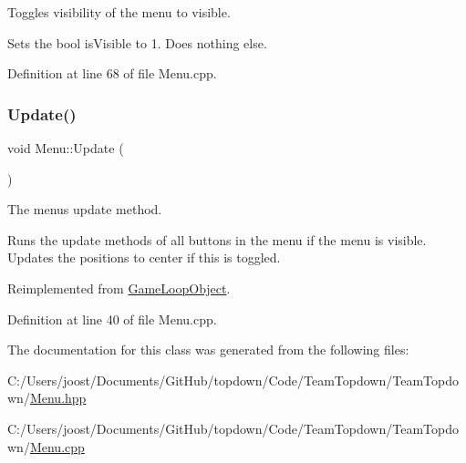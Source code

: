 Toggles visibility of the menu to visible. 

Sets the bool is\+Visible to 1. Does nothing else. 

Definition at line 68 of file Menu.\+cpp.

\mbox{\label{class_menu_af29d71473a414e31e914bc637840cb3e}} 
\subsubsection{\texorpdfstring{Update()}{Update()}}
{\footnotesize\ttfamily void Menu\+::\+Update (\begin{DoxyParamCaption}{ }\end{DoxyParamCaption})\hspace{0.3cm}{\ttfamily [virtual]}}



The menu\textquotesingle{}s update method. 

Runs the update methods of all buttons in the menu if the menu is visible. Updates the positions to center if this is toggled. 

Reimplemented from \hyperlink{class_game_loop_object_ae36a15981f1dd3f3bea6050473490349}{Game\+Loop\+Object}.



Definition at line 40 of file Menu.\+cpp.



The documentation for this class was generated from the following files\+:\begin{DoxyCompactItemize}
\item 
C\+:/\+Users/joost/\+Documents/\+Git\+Hub/topdown/\+Code/\+Team\+Topdown/\+Team\+Topdown/\hyperlink{_menu_8hpp}{Menu.\+hpp}\item 
C\+:/\+Users/joost/\+Documents/\+Git\+Hub/topdown/\+Code/\+Team\+Topdown/\+Team\+Topdown/\hyperlink{_menu_8cpp}{Menu.\+cpp}\end{DoxyCompactItemize}
